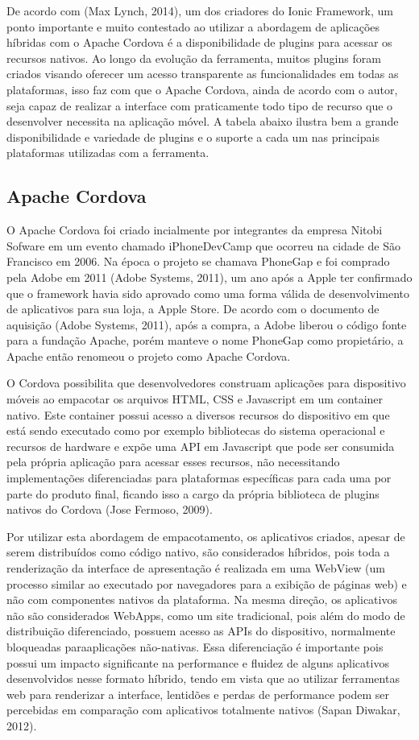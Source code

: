 De acordo com (Max Lynch, 2014), um dos criadores do Ionic Framework, um ponto importante e muito contestado ao utilizar a abordagem de aplicações híbridas com o Apache Cordova é a disponibilidade de plugins para acessar os recursos nativos. Ao longo da evolução da ferramenta, muitos plugins foram criados visando oferecer um acesso transparente as funcionalidades em todas as plataformas, isso faz com que o Apache Cordova, ainda de acordo com o autor, seja capaz de realizar a interface com praticamente todo tipo de recurso que o desenvolver necessita na aplicação móvel. A tabela abaixo ilustra bem a grande disponibilidade e variedade de plugins e o suporte a cada um nas principais plataformas utilizadas com a ferramenta. 

\subsection{\esp Apache Cordova}

O Apache Cordova foi criado incialmente por integrantes da empresa Nitobi Sofware em um evento chamado iPhoneDevCamp que ocorreu na cidade de São Francisco em 2006. Na época o projeto se chamava PhoneGap e foi comprado pela Adobe em 2011 (Adobe Systems, 2011), um ano após a Apple ter confirmado que o framework havia sido aprovado como uma forma válida de desenvolvimento de aplicativos para sua loja, a Apple Store. De acordo com o documento de aquisição (Adobe Systems, 2011), após a compra, a Adobe liberou o código fonte para a fundação Apache, porém manteve o nome PhoneGap como propietário, a Apache então renomeou o projeto como Apache Cordova.

O Cordova possibilita que desenvolvedores construam aplicações para dispositivo móveis ao empacotar os arquivos HTML, CSS e Javascript em um container nativo. Este container possui acesso a diversos recursos do dispositivo em que está sendo executado como por exemplo bibliotecas do sistema operacional e recursos de hardware e expõe uma API em Javascript que pode ser consumida pela própria aplicação para acessar esses recursos, não necessitando implementações diferenciadas para plataformas específicas para cada uma por parte do produto final, ficando isso a cargo da própria biblioteca de plugins nativos do Cordova (Jose Fermoso, 2009).

Por utilizar esta abordagem de empacotamento, os aplicativos criados, apesar de serem distribuídos como código nativo, são considerados híbridos, pois toda a renderização da interface de apresentação é realizada em uma WebView (um processo similar ao executado por navegadores para a exibição de páginas web) e não com componentes nativos da plataforma. Na mesma direção, os aplicativos não são considerados WebApps, como um site tradicional, pois além do modo de distribuição diferenciado, possuem acesso as APIs do dispositivo, normalmente bloqueadas paraaplicações não-nativas. Essa diferenciação é importante pois possui um impacto significante na performance e fluidez de alguns aplicativos desenvolvidos nesse formato híbrido, tendo em vista que ao utilizar ferramentas web para renderizar a interface, lentidões e perdas de performance podem ser percebidas em comparação com aplicativos totalmente nativos (Sapan Diwakar, 2012).

